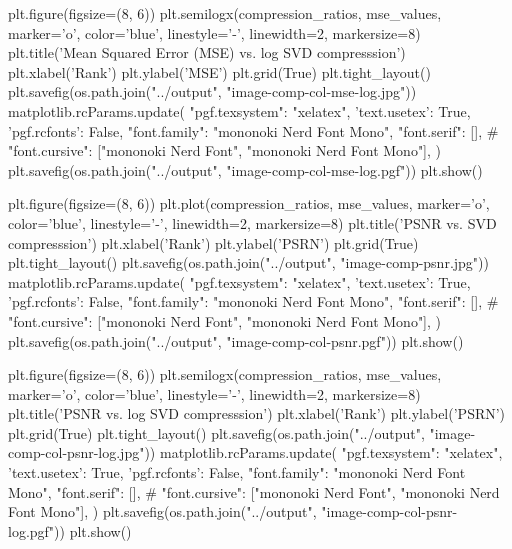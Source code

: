 \begin{latin}
\begin{python}
plt.figure(figsize=(8, 6))
plt.semilogx(compression_ratios, mse_values, marker='o', color='blue', linestyle='-', linewidth=2, markersize=8)
plt.title('Mean Squared Error (MSE) vs. log SVD compresssion')
plt.xlabel('Rank')
plt.ylabel('MSE')
plt.grid(True)
plt.tight_layout()
plt.savefig(os.path.join("../output", "image-comp-col-mse-log.jpg"))
matplotlib.rcParams.update({
    "pgf.texsystem": "xelatex",
    'text.usetex': True,
    'pgf.rcfonts': False,
    "font.family": "mononoki Nerd Font Mono",
    "font.serif": [],
    #  "font.cursive": ["mononoki Nerd Font", "mononoki Nerd Font Mono"],
})
plt.savefig(os.path.join("../output", "image-comp-col-mse-log.pgf"))
plt.show()

plt.figure(figsize=(8, 6))
plt.plot(compression_ratios, mse_values, marker='o', color='blue', linestyle='-', linewidth=2, markersize=8)
plt.title('PSNR vs. SVD compresssion')
plt.xlabel('Rank')
plt.ylabel('PSRN')
plt.grid(True)
plt.tight_layout()
plt.savefig(os.path.join("../output", "image-comp-psnr.jpg"))
matplotlib.rcParams.update({
    "pgf.texsystem": "xelatex",
    'text.usetex': True,
    'pgf.rcfonts': False,
    "font.family": "mononoki Nerd Font Mono",
    "font.serif": [],
    #  "font.cursive": ["mononoki Nerd Font", "mononoki Nerd Font Mono"],
})
plt.savefig(os.path.join("../output", "image-comp-col-psnr.pgf"))
plt.show()


plt.figure(figsize=(8, 6))
plt.semilogx(compression_ratios, mse_values, marker='o', color='blue', linestyle='-', linewidth=2, markersize=8)
plt.title('PSNR vs. log SVD compresssion')
plt.xlabel('Rank')
plt.ylabel('PSRN')
plt.grid(True)
plt.tight_layout()
plt.savefig(os.path.join("../output", "image-comp-col-psnr-log.jpg"))
matplotlib.rcParams.update({
    "pgf.texsystem": "xelatex",
    'text.usetex': True,
    'pgf.rcfonts': False,
    "font.family": "mononoki Nerd Font Mono",
    "font.serif": [],
    #  "font.cursive": ["mononoki Nerd Font", "mononoki Nerd Font Mono"],
})
plt.savefig(os.path.join("../output", "image-comp-col-psnr-log.pgf"))
plt.show()

  \end{python}
\end{latin}



